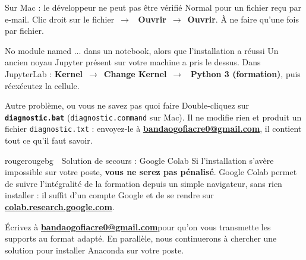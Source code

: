 \documentclass[11pt,a4paper]{article}
\makeatletter
\newenvironment{alerte}[1]   {\begin{encadre}{rouge}{rougebg}{\ding{110}~~#1}}{\end{encadre}}
\newcommand{\courriel}{bandaogofiacre0@gmail.com}
\newcommand{\adressecontact}{%
  \href{mailto:\courriel}{\textbf{\color{bleuclair}\courriel}}}
\newcommand{\fichier}[1]{\texttt{#1}}
\newcommand{\fleche}{~$\rightarrow$~}
\makeatother
\begin{document}
\begin{probleme}{Sur Mac : \og le développeur ne peut pas être vérifié\fg{}}
Normal pour un fichier reçu par e-mail. Clic droit sur le fichier\fleche
\textbf{Ouvrir}\fleche\textbf{Ouvrir}. À ne faire qu'une fois par fichier.
\end{probleme}

\begin{probleme}{\og No module named ...\fg{} dans un notebook, alors que l'installation a réussi}
Un ancien noyau Jupyter présent sur votre machine a pris le dessus. Dans
JupyterLab : \textbf{Kernel}\fleche\textbf{Change Kernel}\fleche
\og \textbf{Python 3 (formation)}\fg{}, puis réexécutez la cellule.
\end{probleme}

\begin{probleme}{Autre problème, ou vous ne savez pas quoi faire}
Double-cliquez sur \fichier{\textbf{diagnostic.bat}}
(\fichier{diagnostic.command} sur Mac). Il ne modifie rien et produit un fichier
\fichier{diagnostic.txt} : envoyez-le à \adressecontact, il contient tout ce qu'il
faut savoir.
\end{probleme}

\vspace{6pt}
\begin{alerte}{Solution de secours : Google Colab}
Si l'installation s'avère impossible sur votre poste, \textbf{vous ne serez pas
pénalisé}. Google Colab permet de suivre l'intégralité de la formation depuis un
simple navigateur, sans rien installer : il suffit d'un compte Google et de se
rendre sur \textbf{\href{https://colab.research.google.com}%
{\color{rouge}\underline{colab.research.google.com}}}.

\vspace{4pt}
Écrivez à \adressecontact pour qu'on vous transmette les supports au format adapté.
En parallèle, nous continuerons à chercher une solution pour installer Anaconda
sur votre poste.
\end{alerte}
\end{document}
